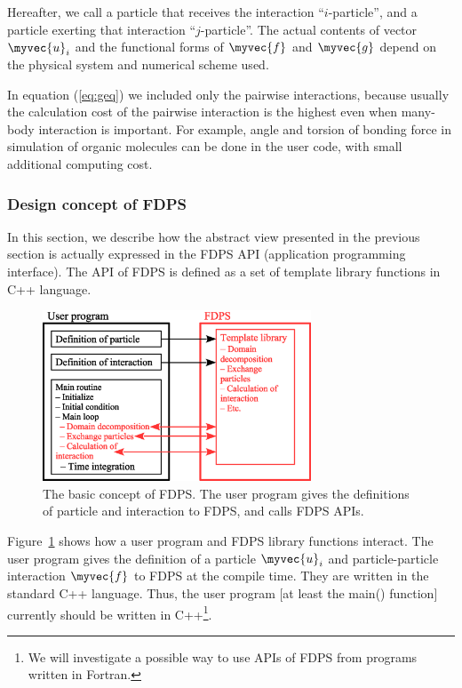 Hereafter, we call a particle that receives the interaction
``$i$-particle'', and a particle exerting that interaction
``$j$-particle''. The actual contents of vector $\myvec{u}_i$ and the
functional forms of $\myvec{f}$ and $\myvec{g}$ depend on the physical
system and numerical scheme used.

In equation (\ref{eq:geq}) we included only the pairwise interactions,
because usually the calculation cost of the pairwise interaction is
the highest even when many-body interaction is important. For example,
angle and torsion of bonding force in simulation of organic molecules
can be done in the user code, with small additional computing cost.


\subsubsection{Design concept of FDPS}
\label{sec:concept}

In this section, we describe how the abstract view presented in the
previous section is actually expressed in the FDPS API (application
programming interface).  The API of FDPS is defined as a set of
template library functions in C++ language.


\begin{figure}
  \begin{center}
    \includegraphics[width=8cm]{figure/concept.eps}
  \end{center}
  \caption{The basic concept of FDPS. The user program gives the
    definitions of particle and interaction to FDPS, and calls FDPS
    APIs.}
  \label{fig:concept}
\end{figure}


Figure~\ref{fig:concept} shows how a user program and FDPS library
functions interact.  The user program gives the definition of a
particle $\myvec{u}_i$ and particle-particle interaction $\myvec{f}$
to FDPS at the compile time. They are written in the standard C++
language. Thus, the user program [at least the main() function]
currently should be written in C++\footnote{We will investigate a
  possible way to use APIs of FDPS from programs written in Fortran.}.

